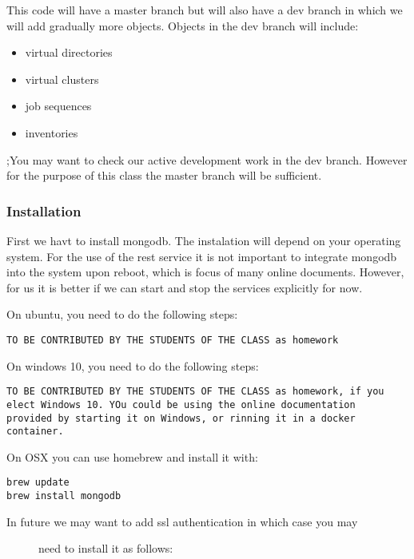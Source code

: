 This code will have a master branch but will also have a dev branch in
which we will add gradually more objects. Objects in the dev branch will
include:

\begin{itemize}

\item
  virtual directories
\item
  virtual clusters
\item
  job sequences
\item
  inventories
\end{itemize}

;You may want to check our active development work in the dev branch.
However for the purpose of this class the master branch will be
sufficient.

\subsubsection{Installation}\label{installation}

First we havt to install mongodb. The instalation will depend on your
operating system. For the use of the rest service it is not important to
integrate mongodb into the system upon reboot, which is focus of many
online documents. However, for us it is better if we can start and stop
the services explicitly for now.

On ubuntu, you need to do the following steps:

\begin{verbatim}
TO BE CONTRIBUTED BY THE STUDENTS OF THE CLASS as homework
\end{verbatim}

On windows 10, you need to do the following steps:

\begin{verbatim}
TO BE CONTRIBUTED BY THE STUDENTS OF THE CLASS as homework, if you
elect Windows 10. YOu could be using the online documentation
provided by starting it on Windows, or rinning it in a docker container.
\end{verbatim}

On OSX you can use homebrew and install it with:

\begin{verbatim}
brew update
brew install mongodb
\end{verbatim}

\begin{description}
\item[In future we may want to add ssl authentication in which case you
may]
need to install it as follows:
\end{description}

